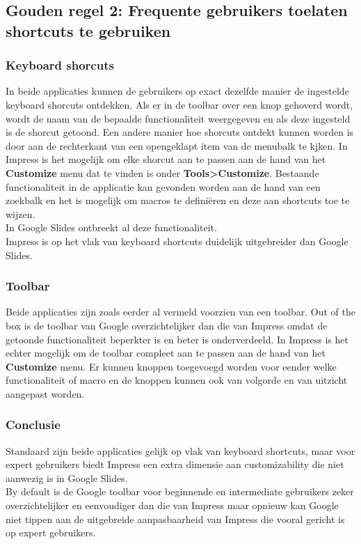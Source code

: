 \documentclass[a4paper]{article}
\begin{document}
\subsection{Gouden regel 2: Frequente gebruikers toelaten shortcuts te gebruiken}
\subsubsection{Keyboard shorcuts}
In beide applicaties kunnen de gebruikers op exact dezelfde manier de ingestelde keyboard shorcuts ontdekken. Als er in de toolbar over een knop gehoverd wordt, wordt de naam van de bepaalde functionaliteit weergegeven en als deze ingesteld is de shorcut getoond. Een andere manier hoe shorcuts ontdekt kunnen worden is door aan de rechterkant van een opengeklapt item van de menubalk te kjken.
In Impress is het mogelijk om elke shorcut aan te passen aan de hand van het \textbf{Customize} menu dat te vinden is onder \textbf{Tools\textgreater Customize}. Bestaande functionaliteit in de applicatie kan gevonden worden aan de hand van een zoekbalk en het is mogelijk om macros te defini\"eren en deze aan shortcuts toe te wijzen.
\\
In Google Slides ontbreekt al deze functionaliteit.\\
Impress is op het vlak van keyboard shortcuts duidelijk uitgebreider dan Google Slides.
\subsubsection{Toolbar}
Beide applicaties zijn zoals eerder al vermeld voorzien van een toolbar. Out of the box is de toolbar van Google overzichtelijker dan die van Impress omdat de getoonde functionaliteit beperkter is en beter is onderverdeeld. In Impress is het echter mogelijk om de toolbar compleet aan te passen aan de hand van het \textbf{Customize} menu. Er kunnen knoppen toegevoegd worden voor eender welke functionaliteit of macro en de knoppen kunnen ook van volgorde en van uitzicht aangepast worden.
\subsubsection{Conclusie}
Standaard zijn beide applicaties gelijk op vlak van keyboard shortcuts, maar voor expert gebruikers biedt Impress een extra dimensie aan customizability die niet aanwezig is in Google Slides.\\
By default is de Google toolbar voor beginnende en intermediate gebruikers zeker overzichtelijker en eenvoudiger dan die van Impress maar opnieuw kan Google niet tippen aan de uitgebreide aanpasbaarheid van Impress die vooral gericht is op expert gebruikers.
\end{document}
